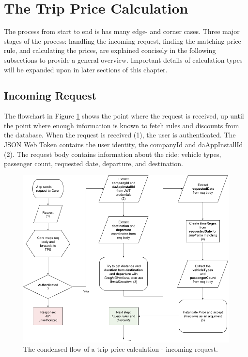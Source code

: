 \section{The Trip Price Calculation}
The process from start to end is has many edge- and corner cases. Three major stages of the process: handling the incoming request, finding the matching price rule, and calculating the prices, are explained concisely in the following subsections to provide a general overview. Important details of calculation types will be expanded upon in later sections of this chapter.

\subsection{Incoming Request}
The flowchart in Figure \ref{fig:Incoming Request} shows the point where the request is received, up until the point where enough information is known to fetch rules and discounts from the database. When the request is received (1), the user is authenticated. The JSON Web Token contains the user identity, the companyId and daAppInstallId (2). The request body contains information about the ride: vehicle types, passenger count, requested date, departure, and destination.

\begin{figure}[H]
	\centering
	\includegraphics[width=.8\textwidth]{IncomingRequest}
	\caption[Incoming Request]{The condensed flow of a trip price calculation - incoming request.}
	\label{fig:Incoming Request}
\end{figure}

